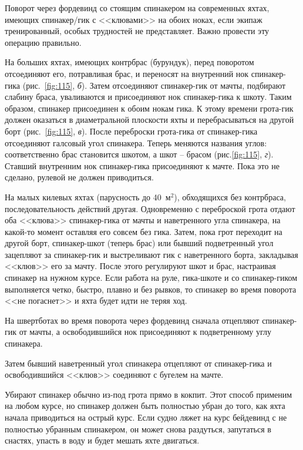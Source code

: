 \documentclass[a4paper, 12pt, twoside, final]{scrbook}
\begin{document}
Поворот через фордевинд со стоящим спинакером на современных яхтах, имеющих спинакер\-/гик с <<клювами>> на обоих ноках, если экипаж тренированный, особых трудностей не представляет. Важно провести эту операцию правильно.

На больших яхтах, имеющих контрбрас (бурундук), перед поворотом отсоединяют его, потравливая брас, и переносят на внутренний нок спинакер-гика (рис.~\ref{fig:115}, \textit{б}). Затем отсоединяют спинакер-гик от мачты, подбирают слабину браса, уваливаются и присоединяют нок спинакер-гика к шкоту. Таким образом, спинакер присоединен к обоим нокам гика. К этому времени грота-гик должен оказаться в диаметральной плоскости яхты и перебрасываться на другой борт (рис.~\ref{fig:115}, \textit{в}). После переброски грота-гика от спинакер-гика отсоединяют галсовый угол спинакера. Теперь меняются названия углов: соответственно брас становится шкотом, а шкот \--- брасом (рис.\ref{fig:115}, \textit{г}). Ставший внутренним нок спинакер-гика присоединяют к мачте. Пока это не сделано, рулевой не должен приводиться. 

На малых килевых яхтах (парусность до 40~м$^2$), обходящихся без контрбраса, последовательность действий другая. Одновременно с переброской грота отдают оба <<клюва>> спинакер-гика от мачты и наветренного угла спинакера, на какой-то момент оставляя его совсем без гика. Затем, пока грот переходит на другой борт, спинакер-шкот (теперь брас) или бывший подветренный угол зацепляют за спинакер-гик и выстреливают гик с наветренного борта, закладывая <<клюв>> его за мачту. После этого регулируют шкот и брас, настраивая спинакер на нужном курсе. Если работа на руле, гика-шкоте и со спинакер-гиком выполняется четко, быстро, плавно и без рывков, то спинакер во время поворота <<не погаснет>> и яхта будет идти не теряя ход. 

На швертботах во время поворота через фордевинд сначала отцепляют спинакер-гик от мачты, а освободившийся нок присоединяют к подветренному углу спинакера.

Затем бывший наветренный угол спинакера отцепляют от спинакер-гика и освободившийся <<клюв>> соединяют с бугелем на мачте.

Убирают спинакер обычно из-под грота прямо в кокпит. Этот способ применим на любом курсе, но спинакер должен быть полностью убран до того, как яхта начала приводиться на острый курс. Если судно ляжет на курс бейдевинд с не полностью убранным спинакером, он может снова раздуться, запутаться в снастях, упасть в воду и будет мешать яхте двигаться.
\end{document}
